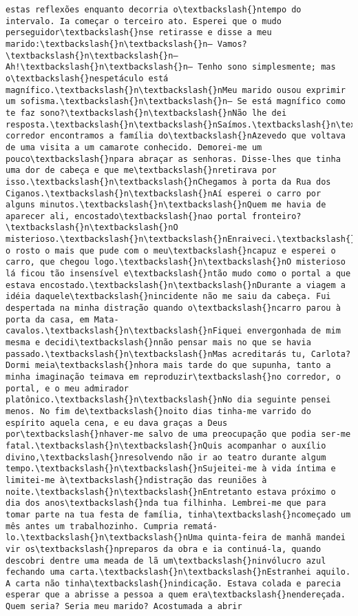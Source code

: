\begin{Verbatim}[commandchars=\\\{\}]
estas reflexões enquanto decorria o\textbackslash{}ntempo do intervalo. Ia começar o terceiro ato. Esperei que o mudo perseguidor\textbackslash{}nse retirasse e disse a meu marido:\textbackslash{}n\textbackslash{}n— Vamos?\textbackslash{}n\textbackslash{}n— Ah!\textbackslash{}n\textbackslash{}n— Tenho sono simplesmente; mas o\textbackslash{}nespetáculo está magnífico.\textbackslash{}n\textbackslash{}nMeu marido ousou exprimir um sofisma.\textbackslash{}n\textbackslash{}n— Se está magnífico como te faz sono?\textbackslash{}n\textbackslash{}nNão lhe dei resposta.\textbackslash{}n\textbackslash{}nSaímos.\textbackslash{}n\textbackslash{}nNo corredor encontramos a família do\textbackslash{}nAzevedo que voltava de uma visita a um camarote conhecido. Demorei-me um pouco\textbackslash{}npara abraçar as senhoras. Disse-lhes que tinha uma dor de cabeça e que me\textbackslash{}nretirava por isso.\textbackslash{}n\textbackslash{}nChegamos à porta da Rua dos Ciganos.\textbackslash{}n\textbackslash{}nAí esperei o carro por alguns minutos.\textbackslash{}n\textbackslash{}nQuem me havia de aparecer ali, encostado\textbackslash{}nao portal fronteiro?\textbackslash{}n\textbackslash{}nO misterioso.\textbackslash{}n\textbackslash{}nEnraiveci.\textbackslash{}n\textbackslash{}nCobri o rosto o mais que pude com o meu\textbackslash{}ncapuz e esperei o carro, que chegou logo.\textbackslash{}n\textbackslash{}nO misterioso lá ficou tão insensível e\textbackslash{}ntão mudo como o portal a que estava encostado.\textbackslash{}n\textbackslash{}nDurante a viagem a idéia daquele\textbackslash{}nincidente não me saiu da cabeça. Fui despertada na minha distração quando o\textbackslash{}ncarro parou à porta da casa, em Mata-cavalos.\textbackslash{}n\textbackslash{}nFiquei envergonhada de mim mesma e decidi\textbackslash{}nnão pensar mais no que se havia passado.\textbackslash{}n\textbackslash{}nMas acreditarás tu, Carlota? Dormi meia\textbackslash{}nhora mais tarde do que supunha, tanto a minha imaginação teimava em reproduzir\textbackslash{}no corredor, o portal, e o meu admirador platônico.\textbackslash{}n\textbackslash{}nNo dia seguinte pensei menos. No fim de\textbackslash{}noito dias tinha-me varrido do espírito aquela cena, e eu dava graças a Deus por\textbackslash{}nhaver-me salvo de uma preocupação que podia ser-me fatal.\textbackslash{}n\textbackslash{}nQuis acompanhar o auxílio divino,\textbackslash{}nresolvendo não ir ao teatro durante algum tempo.\textbackslash{}n\textbackslash{}nSujeitei-me à vida íntima e limitei-me à\textbackslash{}ndistração das reuniões à noite.\textbackslash{}n\textbackslash{}nEntretanto estava próximo o dia dos anos\textbackslash{}nda tua filhinha. Lembrei-me que para tomar parte na tua festa de família, tinha\textbackslash{}ncomeçado um mês antes um trabalhozinho. Cumpria rematá-lo.\textbackslash{}n\textbackslash{}nUma quinta-feira de manhã mandei vir os\textbackslash{}npreparos da obra e ia continuá-la, quando descobri dentre uma meada de lã um\textbackslash{}ninvólucro azul fechando uma carta.\textbackslash{}n\textbackslash{}nEstranhei aquilo. A carta não tinha\textbackslash{}nindicação. Estava colada e parecia esperar que a abrisse a pessoa a quem era\textbackslash{}nendereçada. Quem seria? Seria meu marido? Acostumada a abrir 
\end{Verbatim}
